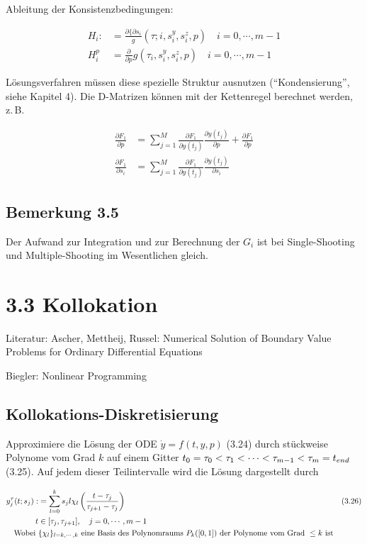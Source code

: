 Ableitung der Konsistenzbedingungen:

\begin{align*}
H_i :&= \frac{\partial\{\partial s_i} g(\tau;i, s_i^y, s_i^z, p) \quad i=0,\cdots,m-1 \\
H_i^p &= \frac{\partial}{\partial p} g(\tau_i, s_i^y, s_i^z, p) \quad i=0,\cdots,m-1
\end{align*}

Lösungsverfahren müssen diese spezielle Struktur ausnutzen ("`Kondensierung"', siehe Kapitel 4). Die D-Matrizen können mit der Kettenregel berechnet werden, z.\,B.

\begin{align*}
\frac{\partial F_1}{\partial p} &= \sum_{j=1}^M \frac{\partial F_1}{\partial y(t_j)} \frac{\partial y(t_j)}{\partial p} + \frac{\partial F_1}{\partial p} \\
\frac{\partial F_1}{\partial s_i} &= \sum_{j=1}^M \frac{\partial F_1}{\partial y(t_j)} \frac{\partial y(t_j)}{\partial s_i}
\end{align*}

\subsection*{Bemerkung 3.5}

Der Aufwand zur Integration und zur Berechnung der $G_i$ ist bei Single-Shooting und Multiple-Shooting im Wesentlichen gleich.

\section*{3.3 Kollokation}

Literatur: Ascher, Mettheij, Russel: Numerical Solution of Boundary Value Problems for Ordinary Differential Equations

Biegler: Nonlinear Programming

\subsection*{Kollokations-Diskretisierung}

Approximiere die Lösung der ODE $\dot y = f(t,y,p)$ (3.24) durch stückweise Polynome vom Grad $k$ auf einem Gitter $t_0 = \tau_0 < \tau_1 < \cdots < \tau_{m-1} < \tau_m = t_{end}$ (3.25). Auf jedem dieser Teilintervalle wird die Lösung dargestellt durch

\begin{align*}
y_j^\tau (t; s_j) :&= \sum\limits_{l=0}^k s_j l \chi_l \left( \frac{t-\tau_j}{\tau_{j+1}-\tau_j} \right) & (3.26)\\
t &\in [\tau_j, \tau_{j+1}], \quad j=0,\cdots,m-1 \\
\text{Wobei } & \{ \chi_l \}_{l=k,\cdots,k} \text{ eine Basis des Polynomraums } P_k([0,1]) \text{ der Polynome vom Grad } \leq k \text{ ist}
\end{align*}

